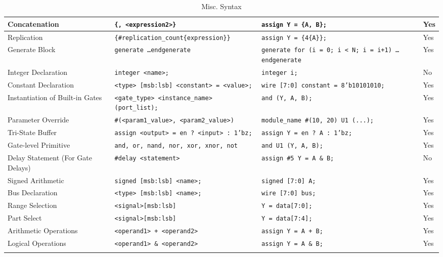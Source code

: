 \documentclass[12pt]{journal}
\begin{document}
\begin{longtable}{|>{\centering\arraybackslash}m{4cm}|>{\centering\arraybackslash}m{6cm}|>{\centering\arraybackslash}m{4cm}|>{\centering\arraybackslash}m{2cm}|}
\hline
Concatenation & \texttt{\{<expression1>, <expression2>\}} & \texttt{assign Y = \{A, B\};} & Yes \\
\hline
Replication & \texttt{\{\#replication\_count\{expression\}\}} & \texttt{assign Y = \{4\{A\}\};} & Yes \\
\hline
Generate Block & \texttt{generate \dots endgenerate} & \texttt{generate for (i = 0; i < N; i = i+1) \dots endgenerate} & Yes \\
\hline
Integer Declaration & \texttt{integer <name>;} & \texttt{integer i;} & No \\
\hline
Constant Declaration & \texttt{<type> [msb:lsb] <constant> = <value>;} & \texttt{wire [7:0] constant = 8'b10101010;} & Yes \\
\hline
Instantiation of Built-in Gates & \texttt{<gate\_type> <instance\_name> (port\_list);} & \texttt{and (Y, A, B);} & Yes \\
\hline
Parameter Override & \texttt{\#(<param1\_value>, <param2\_value>)} & \texttt{module\_name \#(10, 20) U1 (...);} & Yes \\
\hline
Tri-State Buffer & \texttt{assign <output> = en ? <input> : 1'bz;} & \texttt{assign Y = en ? A : 1'bz;} & Yes \\
\hline
Gate-level Primitive & \texttt{and, or, nand, nor, xor, xnor, not} & \texttt{and U1 (Y, A, B);} & Yes \\
\hline
Delay Statement (For Gate Delays) & \texttt{\#delay <statement>} & \texttt{assign \#5 Y = A \& B;} & No \\
\hline
Signed Arithmetic & \texttt{signed [msb:lsb] <name>;} & \texttt{signed [7:0] A;} & Yes \\
\hline
Bus Declaration & \texttt{<type> [msb:lsb] <name>;} & \texttt{wire [7:0] bus;} & Yes \\
\hline
Range Selection & \texttt{<signal>[msb:lsb]} & \texttt{Y = data[7:0];} & Yes \\
\hline
Part Select & \texttt{<signal>[msb:lsb]} & \texttt{Y = data[7:4];} & Yes \\
\hline
Arithmetic Operations & \texttt{<operand1> + <operand2>} & \texttt{assign Y = A + B;} & Yes \\
\hline
Logical Operations & \texttt{<operand1> \& <operand2>} & \texttt{assign Y = A \& B;} & Yes \\
\hline
\caption{Misc. Syntax}
\label{tab:misc}
\end{longtable}
\end{document}

